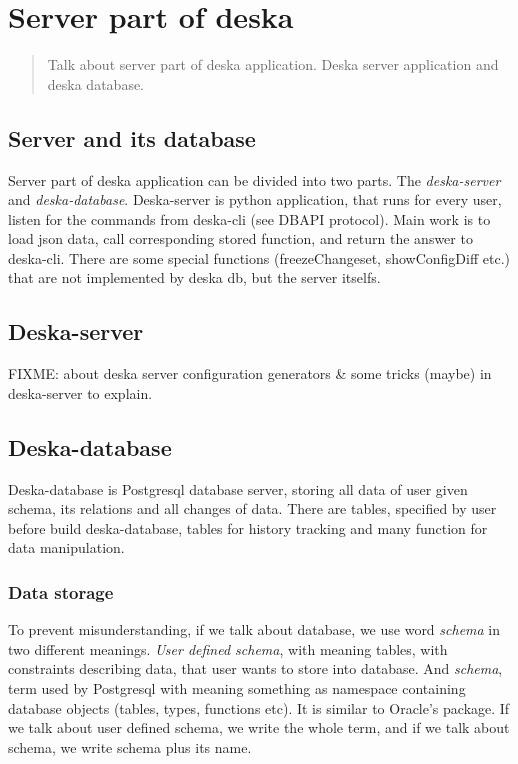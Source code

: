 \documentclass[deska]{subfiles}
\begin{document}
\chapter{Server part of deska}
\label{sec:deska-server}

\begin{abstract}
Talk about server part of deska application. Deska server application and deska database.
\end{abstract}

\section{Server and its database}
Server part of deska application can be divided into two parts. The {\em deska-server} and {\em deska-database}.
Deska-server is python application, that runs for every user, listen for the commands from deska-cli (see DBAPI protocol).
Main work is to load json data, call corresponding stored function, and return the answer to deska-cli.
There are some special functions (freezeChangeset, showConfigDiff etc.) that are not implemented by deska db, but the server itselfs.

\section{Deska-server}
FIXME: about deska server configuration generators \& some tricks (maybe) in deska-server to explain.

\section{Deska-database}
Deska-database is Postgresql database server, storing all data of user given schema, its relations and all changes of data.
There are tables, specified by user before build deska-database, tables for history tracking and many function for data manipulation.

\subsection{Data storage}
To prevent misunderstanding, if we talk about database, we use word {\em schema} in two different meanings. {\em User defined schema},
with meaning tables, with constraints describing data, that user wants to store into database. And {\em schema}, term used by
Postgresql with meaning something as namespace containing database objects (tables, types, functions etc).
It is similar to Oracle's package. If we talk about user defined schema, we write the whole term, and if we talk about schema, we write
schema plus its name.
\end{document}
